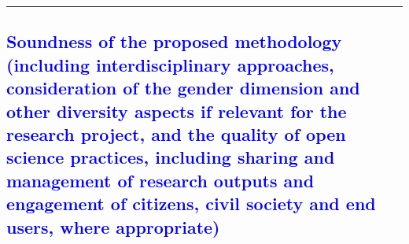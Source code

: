 \documentclass[11pt,a4paper]{article}
\begin{document}
\noindent\rule{\textwidth}{0.5pt}














\newpage

\textcolor{Blue}{\subsection{Soundness of the proposed methodology (including interdisciplinary approaches, consideration of the gender dimension and other diversity aspects if relevant for the research project, and the quality of open science practices, including sharing and management of research outputs and engagement of citizens, civil society and end users, where appropriate)}}
\end{document}
